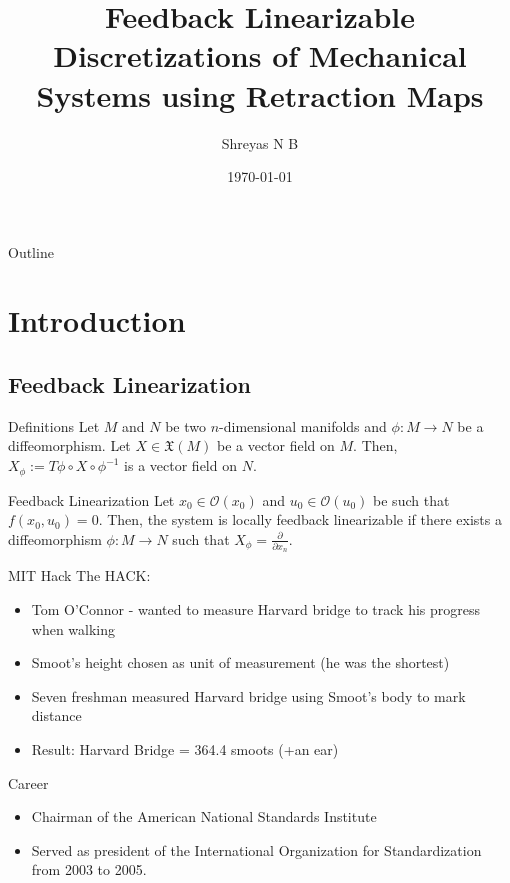 \documentclass{beamer}
\title{Feedback Linearizable Discretizations of Mechanical Systems using Retraction Maps}
\author{Shreyas N B}
\date{\today}
\begin{document}

\frame{\titlepage}

\section[Outline]{}
\begin{frame}{Outline}
  \tableofcontents
\end{frame}

\section{Introduction}
\subsection{Feedback Linearization}
\begin{frame}{Definitions}
  Let $M$ and $N$ be two $n$-dimensional manifolds and $\phi: M \to N$ be a diffeomorphism. Let $X \in \mathfrak{X}(M)$ be a vector field on $M$. Then, $X_{\phi} := T\phi \circ X \circ \phi^{-1}$ is a vector field on $N$.
  \begin{block}{Feedback Linearization}
    Let $x_0 \in \mathcal{O}(x_0)$ and $u_0 \in \mathcal{O}(u_0)$ be such that $f(x_0,u_0) = 0$. Then, the system is locally feedback linearizable if there exists a diffeomorphism $\phi: M \to N$ such that $X_{\phi} = \frac{\partial}{\partial x_n}$. 

  \end{block}

\end{frame}
\begin{frame}{MIT Hack}
  The HACK:
  \pause
  \begin{itemize}
    \item<2-> Tom O'Connor - wanted to measure Harvard bridge to track his progress when walking
    \item<3-> Smoot's height chosen as unit of measurement (he was the shortest)
    \item<4-> Seven freshman measured Harvard bridge using Smoot's body to mark distance
    \item<5-> Result: Harvard Bridge = 364.4 smoots (+an ear)
  \end{itemize}
\end{frame}
\begin{frame}{Career}
  \begin{itemize}
    \item<1-> Chairman of the American National Standards Institute 
    \item<2-> Served as president of the International Organization for Standardization from 2003 to 2005.
  \end{itemize}
\end{frame}
% 
\end{document}
